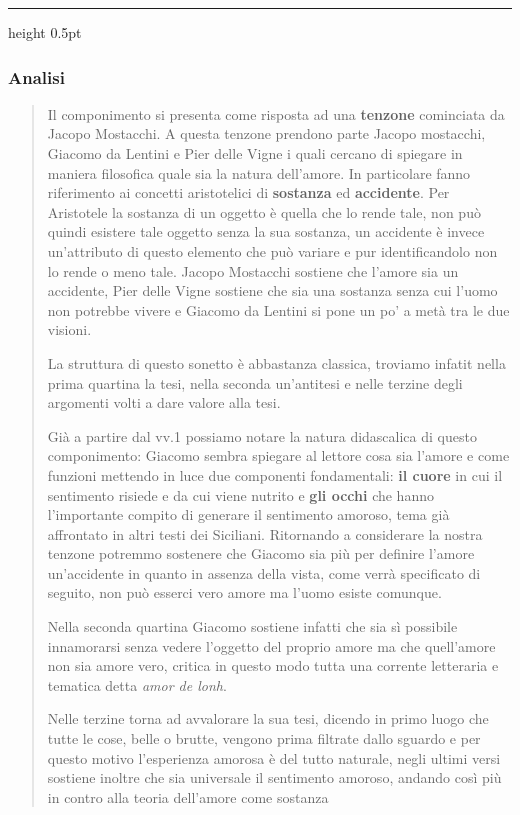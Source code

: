 \vspace{0.5em}
{\color{Tomato!40}\hrule height 0.5pt}
\vspace{1em}

\subsubsection*{Analisi}
\begin{quote}
\small 
Il componimento si presenta come risposta ad una \textbf{tenzone} cominciata da Jacopo Mostacchi. A questa tenzone prendono parte Jacopo mostacchi, Giacomo da Lentini e Pier delle Vigne i quali cercano di spiegare in maniera filosofica quale sia la natura dell'amore. In particolare fanno riferimento ai concetti aristotelici di \textbf{sostanza} ed \textbf{accidente}. Per Aristotele la sostanza di un oggetto è quella che lo rende tale, non può quindi esistere tale oggetto senza la sua sostanza, un accidente è invece un'attributo di questo elemento che può variare e pur identificandolo non lo rende o meno tale.
Jacopo Mostacchi sostiene che l'amore sia un accidente, Pier delle Vigne sostiene che sia una sostanza senza cui l'uomo non potrebbe vivere e Giacomo da Lentini si pone un po' a metà tra le due visioni.

La struttura di questo sonetto è abbastanza classica, troviamo infatit nella prima quartina la tesi, nella seconda un'antitesi e nelle terzine degli argomenti volti a dare valore alla tesi.

Già a partire dal vv.1 possiamo notare la natura didascalica di questo componimento: Giacomo sembra spiegare al lettore cosa sia l'amore e come funzioni mettendo in luce due componenti fondamentali: \textbf{il cuore} in cui il sentimento risiede e da cui viene nutrito e \textbf{gli occhi} che hanno l'importante compito di generare il sentimento amoroso, tema già affrontato in altri testi dei Siciliani.
Ritornando a considerare la nostra tenzone potremmo sostenere che Giacomo sia più per definire l'amore un'accidente in quanto in assenza della vista, come verrà specificato di seguito, non può esserci vero amore ma l'uomo esiste comunque.

Nella seconda quartina Giacomo sostiene infatti che sia sì possibile innamorarsi senza vedere l'oggetto del proprio amore ma che quell'amore non sia amore vero, critica in questo modo tutta una corrente letteraria e tematica detta \textit{amor de lonh}.

Nelle terzine torna ad avvalorare la sua tesi, dicendo in primo luogo che tutte le cose, belle o brutte, vengono prima filtrate dallo sguardo e per questo motivo l'esperienza amorosa è del tutto naturale, negli ultimi versi sostiene inoltre che sia universale il sentimento amoroso, andando così più in contro alla teoria dell'amore come sostanza
\end{quote}